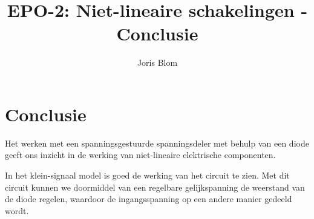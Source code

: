 \documentclass{report}
\title{EPO-2: Niet-lineaire schakelingen - Conclusie}
\author{Joris Blom}
\begin{document}
\chapter{Conclusie}
\label{ch:conclusie}
Het werken met een spanningsgestuurde spanningsdeler met behulp van een diode geeft ons inzicht in de werking van niet-lineaire elektrische componenten.

In het klein-signaal model is goed de werking van het circuit te zien. Met dit circuit kunnen we doormiddel van een regelbare gelijkspanning de weerstand van de diode regelen, waardoor de ingangsspanning op een andere manier gedeeld wordt.
\end{document}
